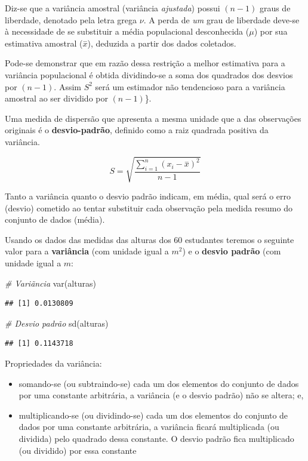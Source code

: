 \documentclass[
]{book}
\newenvironment{Shaded}{\begin{snugshade}}{\end{snugshade}}
\newcommand{\CommentTok}[1]{\textcolor[rgb]{0.56,0.35,0.01}{\textit{#1}}}
\newcommand{\FunctionTok}[1]{\textcolor[rgb]{0.00,0.00,0.00}{#1}}
\newcommand{\NormalTok}[1]{#1}
\providecommand{\tightlist}{%
  \setlength{\itemsep}{0pt}\setlength{\parskip}{0pt}}
\begin{document}
Diz-se que a variância amostral (variância \emph{ajustada}) possui \((n-1)\) graus de liberdade, denotado pela letra grega \(\nu\). A perda de \emph{um} grau de liberdade deve-se à necessidade de se substituir a média populacional desconhecida (\(\mu\)) por sua estimativa amostral (\(\stackrel{-}{x}\)), deduzida a partir dos dados coletados.

Pode-se demonstrar que em razão dessa restrição a melhor estimativa para a variância populacional é obtida dividindo-se a soma dos quadrados dos desvios por \((n-1)\). Assim \(S^{2}\) será um estimador não tendencioso para a variância amostral ao ser dividido por \((n-1)\)\}.

Uma medida de dispersão que apresenta a mesma unidade que a das observações originais é o \textbf{desvio-padrão}, definido como a raiz quadrada positiva da variância.

\[
S= \sqrt{\frac{\sum _{i=1}^{n}\left(x_{i}-\stackrel{-}{x}\right)^{2}}{n-1}}
\]

Tanto a variância quanto o desvio padrão indicam, em média, qual será o erro (desvio) cometido ao tentar substituir cada observação pela medida resumo do conjunto de dados (média).

Usando os dados das medidas das alturas dos 60 estudantes teremos o seguinte valor para a \textbf{variância} (com unidade igual a \(m^{2}\)) e o \textbf{desvio padrão} (com unidade igual a \(m\):

\begin{Shaded}
\begin{Highlighting}[]
\CommentTok{\# Variãncia}
\FunctionTok{var}\NormalTok{(alturas)}
\end{Highlighting}
\end{Shaded}

\begin{verbatim}
## [1] 0.0130809
\end{verbatim}

\begin{Shaded}
\begin{Highlighting}[]
\CommentTok{\# Desvio padrão}
\FunctionTok{sd}\NormalTok{(alturas) }
\end{Highlighting}
\end{Shaded}

\begin{verbatim}
## [1] 0.1143718
\end{verbatim}

Propriedades da variância:

\begin{itemize}
\tightlist
\item
  somando-se (ou subtraindo-se) cada um dos elementos do conjunto de dados por uma constante arbitrária, a variância (e o desvio padrão) não se altera; e,
\item
  multiplicando-se (ou dividindo-se) cada um dos elementos do conjunto de dados por uma constante arbitrária, a variância ficará multiplicada (ou dividida) pelo quadrado dessa constante. O desvio padrão fica multiplicado (ou dividido) por essa constante
\end{itemize}
\end{document}
